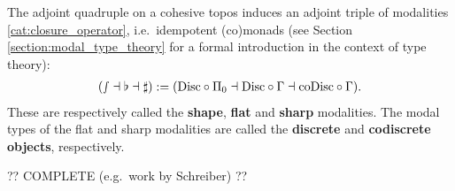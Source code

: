     \begin{property}\label{topos:cohesive_modalities}
        The adjoint quadruple on a cohesive topos induces an adjoint triple of modalities \ref{cat:closure_operator}, i.e.~idempotent (co)monads (see Section \ref{section:modal_type_theory} for a formal introduction in the context of type theory):
        \begin{gather}
            (\smallint\dashv\flat\dashv\sharp):=(\mathrm{Disc}\circ\Pi_0\dashv\mathrm{Disc}\circ\Gamma\dashv\mathrm{coDisc}\circ\Gamma).
        \end{gather}
        These are respectively called the \textbf{shape}, \textbf{flat} and \textbf{sharp} modalities. The modal types of the flat and sharp modalities are called the \textbf{discrete} and \textbf{codiscrete objects}, respectively.
    \end{property}

    ?? COMPLETE (e.g.~work by Schreiber) ??